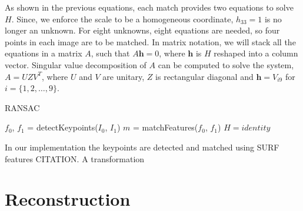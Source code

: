 \documentclass[12pt]{article}
\begin{document}
As shown in the previous equations, each match provides two equations to solve $H$.
Since, we enforce the scale to be a homogeneous coordinate, $h_{33} = 1$ is no longer an unknown.
For eight unknowns, eight equations are needed, so four points in each image are to be matched.
In matrix notation, we will stack all the equations in a matrix $A$, such that $A\mathbf{h}=0$, where $\mathbf{h}$ is $H$ reshaped into a column vector.
Singular value decomposition of $A$ can be computed to solve the system, $A = UZV^T$, where $U$ and $V$ are unitary, $Z$ is rectangular diagonal and $\mathbf{h} = V_{i9}$ for $i = \lbrace 1,2, \ldots, 9 \rbrace$.

\begin{algorithm}[H]
 \caption{RANSAC}
 $f_0$, $f_1$ = detectKeypoints($I_0$, $I_1$)\;
 $m$ = matchFeatures($f_0$, $f_1$)\;
 $H = identity$\;
\end{algorithm}

In our implementation the keypoints are detected and matched using SURF features CITATION.
A transformation 

\section{Reconstruction}
\end{document}
